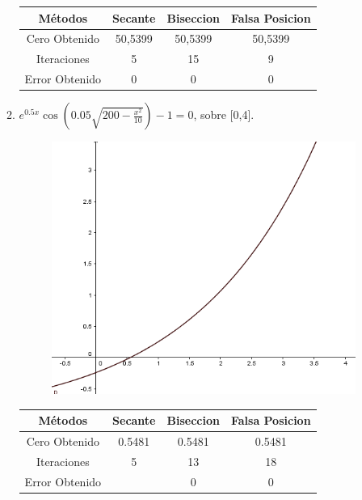 \documentclass{udparticle}
\begin{document}
\begin{enumerate}
\begin{enumerate}
\begin{table}[H]
\begin{tabular} { |c|c|c|c|}
        \hline
        Métodos       & Secante & Biseccion & Falsa Posicion  \\
        \hline
        Cero Obtenido &  50,5399       &    50,5399       &      50,5399          \\
        \hline
        Iteraciones   &     5        &      15     &        9        \\
        \hline
        Error Obtenido &    0       &       0       &       0   \\
        \hline 
        
        \end{tabular}
    \end{table}

\item \(e^{0.5x}\cos(0.05\sqrt{200-\frac{x^2}{10}}) -1 = 0 \), sobre [0,4].\\
    
    \begin{figure}[H]
    \centering
    \includegraphics[width=10cm]{GraficoEj1d}
    \end{figure}
    \begin{table}[H]
    \centering
        \begin{tabular} { |c|c|c|c|}
        
        \hline
        Métodos       & Secante & Biseccion & Falsa Posicion \\
        \hline
        Cero Obtenido &  0.5481       &    0.5481       &      0.5481          \\
        \hline
        Iteraciones   &     5        &      13     &        18       \\
        \hline
        Error Obtenido &  & 0 & 0 \\
        \hline
        

\end{tabular}
\end{table}
\end{enumerate}
\end{enumerate}
\end{document}
